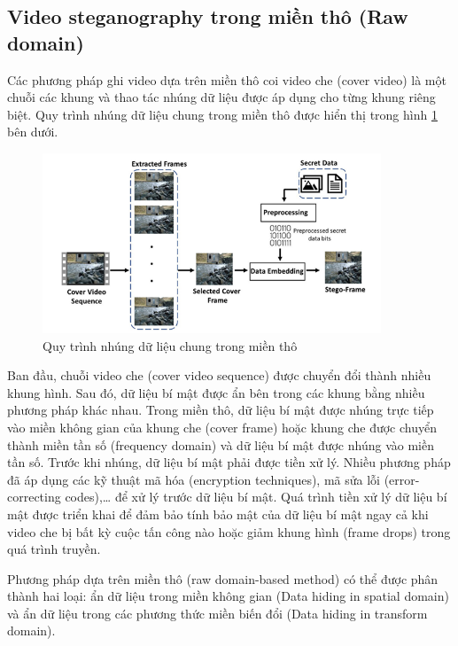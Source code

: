 \subsection{Video steganography trong miền thô (Raw domain)}
Các phương pháp ghi video dựa trên miền thô coi video che (cover video) là một chuỗi các khung và thao tác nhúng dữ liệu được áp dụng cho từng khung riêng biệt. Quy trình nhúng dữ liệu chung trong miền thô được hiển thị trong hình \ref{fig:Process_rawdomain} bên dưới. 

\begin{figure}[!h]
    \centering
    \includegraphics[width=0.9\textwidth]{graphics/chapter-1/Process_rawdomain.png}
    \caption{Quy trình nhúng dữ liệu chung trong miền thô}
    \label{fig:Process_rawdomain}
\end{figure}

Ban đầu, chuỗi video che (cover video sequence) được chuyển đổi thành nhiều khung hình. Sau đó, dữ liệu bí mật được ẩn bên trong các khung bằng nhiều phương pháp khác nhau. Trong miền thô, dữ liệu bí mật được nhúng trực tiếp vào miền không gian của khung che (cover frame) hoặc khung che được chuyển thành miền tần số (frequency domain) và dữ liệu bí mật được nhúng vào miền tần số. Trước khi nhúng, dữ liệu bí mật phải được tiền xử lý. Nhiều phương pháp đã áp dụng các kỹ thuật mã hóa (encryption techniques), mã sửa lỗi (error-correcting codes),… để xử lý trước dữ liệu bí mật. Quá trình tiền xử lý dữ liệu bí mật được triển khai để đảm bảo tính bảo mật của dữ liệu bí mật ngay cả khi video che bị bất kỳ cuộc tấn công nào hoặc giảm khung hình (frame drops) trong quá trình truyền. 

Phương pháp dựa trên miền thô (raw domain-based method) có thể được phân thành hai loại: ẩn dữ liệu trong miền không gian (Data hiding in spatial domain) và ẩn dữ liệu trong các phương thức miền biến đổi (Data hiding in transform domain).

